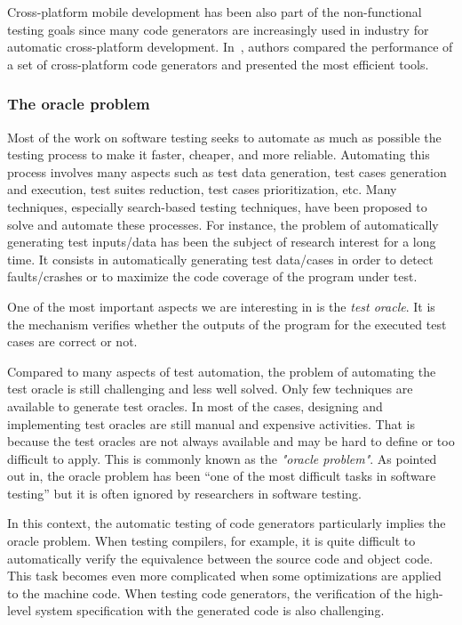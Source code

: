 Cross-platform mobile development has been also part of the non-functional testing goals since many code generators are increasingly used in industry for automatic cross-platform development. In~\cite{pazirandeh2015evaluation,hartmann2011cross}, authors compared the performance of a set of cross-platform code generators and presented the most efficient tools.



\subsubsection{The oracle problem}
\label{sec:The oracle problem}

Most of the work on software testing seeks to automate as much as possible the testing process to make it faster, cheaper, and more reliable. 
Automating this process involves many aspects such as test data generation, test cases generation and execution, test suites reduction, test cases prioritization, etc. Many techniques, especially search-based testing techniques, have been proposed to solve and automate these processes\cite{ali2010systematic}.
For instance, the problem of automatically generating test inputs/data has been the subject of research interest for a long time. It consists in automatically generating test data/cases in order to detect faults/crashes or to maximize the code coverage of the program under test. 

One of the most important aspects we are interesting in is the \textit{test oracle}. It is the mechanism  verifies whether the outputs of the program for the executed test cases are correct or not.

Compared to many aspects of test automation, the problem of automating the test oracle is still challenging and less well solved. Only few techniques are available to generate test oracles. In most of the cases, designing and implementing test oracles are still manual and expensive activities. That is because the test oracles are not always available and may be hard to define or too difficult to apply\cite{barr2015oracle}. This is commonly known as the \textit{"oracle problem"}. 
As pointed out in\cite{manolache2001software}, the oracle problem has been ``one of the most difficult tasks in software testing'' but it is often ignored by researchers in software testing.

In this context, the automatic testing of code generators particularly implies the oracle problem. When testing compilers, for example, it is quite difficult to automatically verify the equivalence between the source code and object code. This task becomes even more complicated when some optimizations are applied to the machine code. 
When testing code generators, the verification of the high-level system specification with the generated code is also challenging.  

